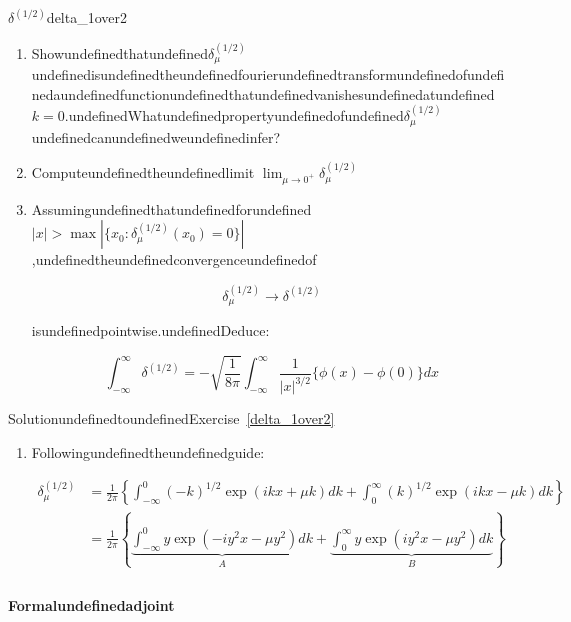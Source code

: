 \begin{mystexercise}{$\delta^{(1/2)}$}{delta_1over2}
\begin{enumerate}
\item Showundefinedthatundefined$\delta^{(1/2)}_{\mu}$undefinedisundefinedtheundefinedfourierundefinedtransformundefinedofundefinedaundefinedfunctionundefinedthatundefinedvanishesundefinedatundefined$k=0$.undefinedWhatundefinedpropertyundefinedofundefined$\delta^{(1/2)}_{\mu}$undefinedcanundefinedweundefinedinfer?
\item Computeundefinedtheundefinedlimit
$\lim_{\mu \to 0^+}\delta^{(1/2)}_{\mu}$
\item Assumingundefinedthatundefinedforundefined$|x|>\max|\{x_0: \delta^{(1/2)}_{\mu}(x_0)=0\}|$,undefinedtheundefinedconvergenceundefinedof

\begin{equation}
\delta^{(1/2)}_{\mu} \rightarrow \delta^{(1/2)}
\end{equation}


isundefinedpointwise.undefinedDeduce:

\begin{equation}
\int_{-\infty}^{\infty}\delta^{(1/2)}=-\sqrt{\frac{1}{8\pi}} \int_{-\infty}^{\infty} \frac{1}{|x|^{3/2}}\{\phi(x)-\phi(0)\}dx
\end{equation}
\end{enumerate}

\end{mystexercise}
\begin{mystsolution}{SolutionundefinedtoundefinedExercise~\ref{delta_1over2}}\begin{enumerate}
\item Followingundefinedtheundefinedguide:

\begin{equation}
\begin{aligned}
\delta^{(1/2)}_{\mu} &= \frac{1}{2\pi}\left\{\int_{-\infty}^0 (-k)^{1/2} \exp(ikx+\mu k)dk + \int_{0}^{\infty} (k)^{1/2} \exp(ikx-\mu k)dk 
\right\} \\
&= 
\frac{1}{2\pi}\left\{\underbrace{\int_{-\infty}^0 y \exp(-iy^2x-\mu y^2)dk}_{A} + \underbrace{\int_{0}^{\infty} y\exp(iy^2x-\mu y^2)dk}_{B} 
\right\} \\
\end{aligned}
\end{equation}
\end{enumerate}

\end{mystsolution}
\paragraph{Formalundefinedadjoint}

